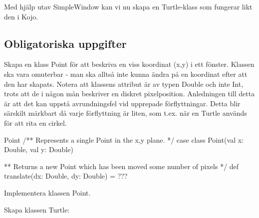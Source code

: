 Med hjälp utav SimpleWindow kan vi nu skapa en Turtle-klass som fungerar likt den i Kojo. 

\subsection{Obligatoriska uppgifter}

\Task Skapa en klass Point för att beskriva en viss koordinat (x,y) i ett fönster. Klassen ska vara omuterbar - man ska alltså inte kunna ändra på en koordinat efter att den har skapats. Notera att klassens attribut är av typen Double och inte Int, trots att de i någon mån beskriver en diskret pixelposition. Anledningen till detta är att det kan uppstå avrundningsfel vid upprepade förflyttningar. Detta blir särskilt märkbart då varje förflyttning är liten, som t.ex. när en Turtle används för att rita en cirkel.

\begin{ScalaSpec}{Point}
/** Represents a single Point in the x,y plane. */
case class Point(val x: Double, val y: Double) {

** Returns a new Point which has been moved some number of pixels */
def translate(dx: Double, dy: Double) = ???
}
\end{ScalaSpec}

\Subtask Implementera klassen Point.




\Task Skapa klassen Turtle:

